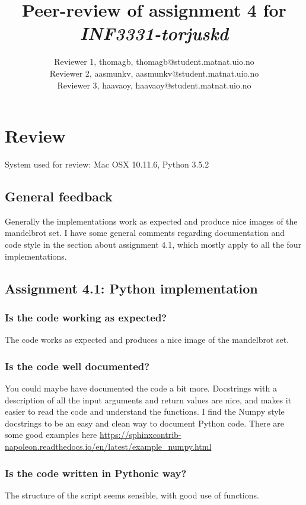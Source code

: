\documentclass[a4paper]{article}
\title{Peer-review of assignment 4 for \textit{INF3331-torjuskd}}
\author{Reviewer 1, thomagb, {thomagb@student.matnat.uio.no} \\
 		Reviewer 2, aasmunkv, {aasmunkv@student.matnat.uio.no} \\
		Reviewer 3, haavaoy, {haavaoy@student.matnat.uio.no}}
\begin{document}
\maketitle



\section{Review}\label{sec:review}

System used for review: Mac OSX 10.11.6, Python 3.5.2

\subsection*{General feedback}

Generally the implementations work as expected and produce nice images of the mandelbrot set. I have some general comments regarding documentation and code style in the section about assignment 4.1, which mostly apply to all the four implementations.


\subsection*{Assignment 4.1: Python implementation}

\subsubsection*{Is the code working as expected?}
The code works as expected and produces a nice image of the mandelbrot set.


\subsubsection*{Is the code well documented?}
You could maybe have documented the code a bit more. Docstrings with a description of all the input arguments and return values are nice, and makes it easier to read the code and understand the functions. I find the Numpy style docstrings to be an easy and clean way to document Python code. There are some good examples here \url{https://sphinxcontrib-napoleon.readthedocs.io/en/latest/example_numpy.html}


\subsubsection*{Is the code written in Pythonic way?}
The structure of the script seems sensible, with good use of functions.
\end{document}
